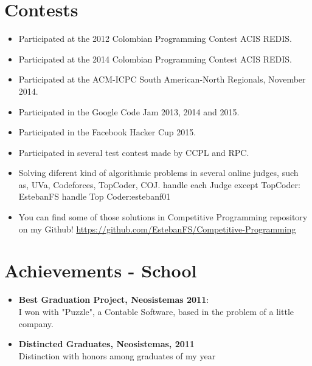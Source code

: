 \documentclass[a4paper,10pt]{article} %
\begin{document}
\section{Contests}
\begin{itemize}
 \item Participated at the 2012 Colombian Programming Contest ACIS REDIS.
 \item Participated at the 2014 Colombian Programming Contest ACIS REDIS.
 \item Participated at the ACM-ICPC South American-North Regionals, November 2014.
 \item Participated in the Google Code Jam 2013, 2014 and 2015.
 \item Participated in the Facebook Hacker Cup 2015.
 \item Participated in several test contest made by CCPL and RPC. 
 \item Solving diferent kind of algorithmic problems in several online judges, such as,
UVa, Codeforces, TopCoder, COJ.
handle each Judge except TopCoder: EstebanFS
handle Top Coder:estebanf01
\item You can find some of those solutions in Competitive Programming repository on my Github! \href{https://github.com/EstebanFS/Competitive-Programming}{https://github.com/EstebanFS/Competitive-Programming}
\end{itemize}


\section{Achievements - School}
\begin{itemize}
\item \textbf{Best Graduation Project, Neosistemas 2011}:\\
I won with "Puzzle", a Contable Software, based in the problem of a little company. 
\item \textbf{Distincted Graduates, Neosistemas, 2011}\\
Distinction with honors among graduates of my year
\end{itemize}
\end{document}
